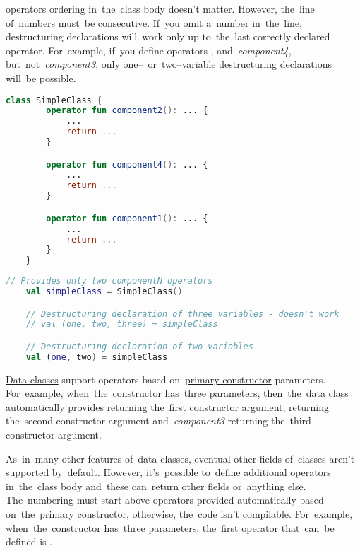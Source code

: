 \noindent {} operators ordering in~the~class body doesn't matter.
However, the~line of~numbers must~be consecutive.
If~you omit a~number in~the~line, destructuring declarations will~work only up to~the~last correctly declared operator.
For~example, if~you define operators ,  \mbox{and \textit{component4}}, \mbox{but not \textit{component3}}, only one--~or~two--variable destructuring declarations will~be possible.

\example
\begin{lstlisting}[language=Kotlin, title={Class with \textit{componentN} operators jumbled and \textit{component3} missing}]
    class SimpleClass {
        operator fun component2(): ... {
            ...
            return ...
        }

        operator fun component4(): ... {
            ...
            return ...
        }

        operator fun component1(): ... {
            ...
            return ...
        }
    }
\end{lstlisting}
\begin{lstlisting}[language=Kotlin, title={Destructuring declaration behavior}]
    // Provides only two componentN operators
    val simpleClass = SimpleClass()

    // Destructuring declaration of three variables - doesn't work
    // val (one, two, three) = simpleClass

    // Destructuring declaration of two variables
    val (one, two) = simpleClass
\end{lstlisting}

\hyperref[kotlindataclass]{Data classes} support  operators based on~\hyperref[kotlinprimaryconstructor]{primary constructor} parameters.
For~example, when~the~constructor has~three parameters, then~the~data class automatically provides  returning the~first constructor argument,  returning the~second constructor argument \mbox{and \textit{component3}} returning the~third constructor argument.

As~in~many other features of~data classes, eventual other fields of~classes aren't supported by~default.
However, it's~possible to~define additional  operators in~the~class body and~these can~return other fields or~anything else.
The~numbering must start above operators provided automatically based on~the~primary constructor, otherwise, the~code isn't compilable.
For~example, when~the~constructor has~three parameters, the~first operator that~can~be defined is .

